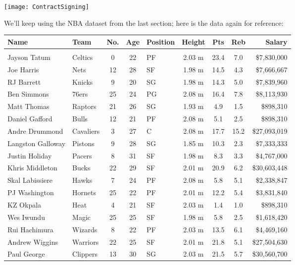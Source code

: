 \setcounter{ExampleCounter}{1}
\begin{center}
\texttt{[image: ContractSigning]}
\end{center}
We'll keep using the NBA dataset from the last section; here is the data again for reference:
\begin{center}
{\footnotesize
\begin{tabular}{l l c c l c c c r}
\textbf{Name} & \textbf{Team} & \textbf{No.} & \textbf{Age} & \textbf{Position} & \textbf{Height} & \textbf{Pts} & \textbf{Reb} & \textbf{Salary}\\
\hline
& & & & & & & \\
Jayson Tatum & Celtics & 0 & 22 & PF & 2.03 m & 23.4 & 7.0 & \$7,830,000\\
Joe Harris & Nets & 12 & 28 & SF & 1.98 m & 14.5 & 4.3 & \$7,666,667\\
RJ Barrett & Knicks & 9 & 20 & SG & 1.98 m & 14.3 & 5.0 & \$7,839,960\\
Ben Simmons & 76ers & 25 & 24 & PG & 2.08 m & 16.4 & 7.8 & \$8,113,930\\
Matt Thomas & Raptors & 21 & 26 & SG & 1.93 m & 4.9 & 1.5 & \$898,310\\
Daniel Gafford & Bulls & 12 & 21 & PF & 2.08 m & 5.1 & 2.5 & \$898,310\\
Andre Drummond & Cavaliers & 3 & 27 & C & 2.08 m & 17.7 & 15.2 & \$27,093,019\\
Langston Galloway & Pistons & 9 & 28 & SG & 1.85 m & 10.3 & 2.3 & \$7,333,333\\
Justin Holiday & Pacers & 8 & 31 & SF & 1.98 m & 8.3 & 3.3 & \$4,767,000\\
Khris Middleton & Bucks & 22 & 29 & SF & 2.01 m & 20.9 & 6.2 & \$30,603,448\\
Skal Labissiere & Hawks & 7 & 24 & PF & 2.08 m & 5.8 & 5.1 & \$2,338,847\\
PJ Washington & Hornets & 25 & 22 & PF & 2.01 m & 12.2 & 5.4 & \$3,831,840\\
KZ Okpala & Heat & 4 & 21 & SF & 2.03 m & 1.4 & 1.0 & \$898,310\\
Wes Iwundu & Magic & 25 & 25 & SF & 1.98 m & 5.8 & 2.5 & \$1,618,420\\
Rui Hachimura & Wizards & 8 & 22 & PF & 2.03 m & 13.5 & 6.1 & \$4,469,160\\
Andrew Wiggins & Warriors & 22 & 25 & SF & 2.01 m & 21.8 & 5.1 & \$27,504,630\\
Paul George & Clippers & 13 & 30 & SG & 2.03 m & 21.5 & 5.7 & \$30,560,700\\

\end{tabular}}
\end{center}
